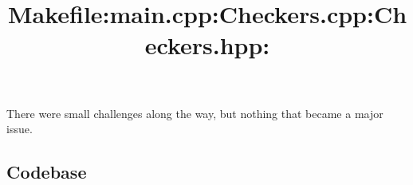 There were small challenges along the way, but nothing that became a major issue.

\newpage
\subsection{Codebase}\label{sec:ps6:code} %

\bigskip
\title{\large Makefile:}

\bigskip
\title{\large main.cpp:}

\bigskip
\title{\large Checkers.cpp:}

\bigskip
\title{\large Checkers.hpp:}


\newpage

